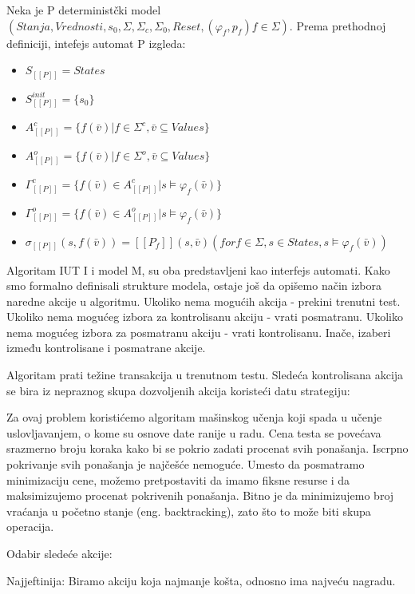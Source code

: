 \documentclass[a4paper]{article}
\theoremstyle{definition}
\begin{document}
{Neka je P deterministčki model $(Stanja, Vrednosti, s_0, \Sigma, \Sigma_c, \Sigma_0, Reset, (\varphi_f, p_f)f \in \Sigma)$. Prema prethodnoj definiciji, intefejs automat P izgleda:


\begin{itemize}
\item $S_{[[P]]} = States$
\item $S^{init}_{[[P]]} = \{s_0\}$
\item $A^c_{[[P]]} = \{ f(\bar{v}) | f \in \Sigma^c, \bar{v} \subseteq Values \}$ 
\item $A^o_{[[P]]} = \{ f(\bar{v}) | f \in \Sigma^o, \bar{v} \subseteq Values \}$
\item $\Gamma^c_{[[P]]} = \{ f(\bar{v}) \in A^c_{[[P]]} | s \models \varphi_f(\bar{v}) \}$ 
\item $\Gamma^o_{[[P]]} = \{ f(\bar{v}) \in A^o_{[[P]]} | s \models \varphi_f(\bar{v}) \}$
\item $\sigma_{[[P]]}(s, f(\bar{v})) = [[P_f]](s, \bar{v}) (for f \in \Sigma, s \in States, s \models \varphi_f(\bar{v}))$
\end{itemize}

Algoritam
IUT I i model M, su oba predstavljeni kao interfejs automati.
Kako smo formalno definisali strukture modela, ostaje još da opišemo način izbora naredne akcije u algoritmu.
Ukoliko nema mogućih akcija - prekini trenutni test. 
Ukoliko nema mogućeg izbora za kontrolisanu akciju - vrati posmatranu.
Ukoliko nema mogućeg izbora za posmatranu akciju - vrati kontrolisanu.
Inače, izaberi između kontrolisane i posmatrane akcije.

Algoritam prati težine transakcija u trenutnom testu. Sledeća kontrolisana akcija se bira iz nepraznog skupa dozvoljenih akcija koristeći datu strategiju:

Za ovaj problem koristićemo algoritam mašinskog učenja koji spada u učenje uslovljavanjem, o kome su osnove date ranije u radu. %
Cena testa se povećava srazmerno broju koraka kako bi se pokrio zadati procenat svih ponašanja. Iscrpno pokrivanje svih ponašanja je najčešće nemoguće. Umesto da posmatramo minimizaciju cene, možemo pretpostaviti da imamo fiksne resurse i da maksimizujemo procenat pokrivenih ponašanja. Bitno je da minimizujemo broj vraćanja u početno stanje (eng. backtracking), zato što to može biti skupa operacija. %

Odabir sledeće akcije:

Najjeftinija: 
Biramo akciju koja najmanje košta, odnosno ima najveću nagradu.

}
\end{document}
